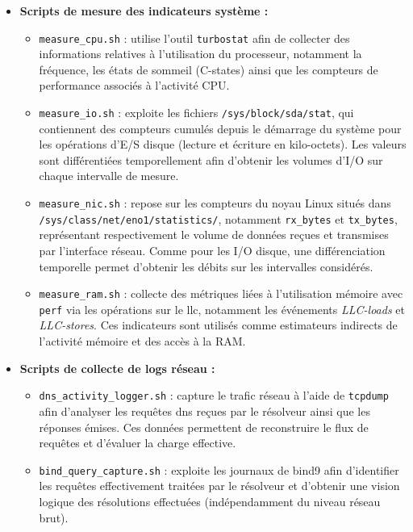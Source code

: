 \documentclass[12pt, a4paper]{report}
\begin{document}
	\begin{itemize}
		\item \textbf{Scripts de mesure des indicateurs système :}
		\begin{itemize}
			\item \texttt{measure\_cpu.sh} : utilise l'outil \texttt{turbostat} afin de collecter des informations relatives à l'utilisation du processeur, notamment la fréquence, les états de sommeil (C-states) ainsi que les compteurs de performance associés à l'activité CPU.

			\item \texttt{measure\_io.sh} : exploite les fichiers \texttt{/sys/block/sda/stat}, qui contiennent des compteurs cumulés depuis le démarrage du système pour les opérations d'E/S disque (lecture et écriture en kilo-octets). Les valeurs sont différentiées temporellement afin d'obtenir les volumes d'I/O sur chaque intervalle de mesure.
			
			\item \texttt{measure\_nic.sh} : repose sur les compteurs du noyau Linux situés dans \\
			\texttt{/sys/class/net/eno1/statistics/}, notamment \texttt{rx\_bytes} et \texttt{tx\_bytes}, représentant respectivement le volume de données reçues et transmises par l'interface réseau. Comme pour les I/O disque, une différenciation temporelle permet d'obtenir les débits sur les intervalles considérés.
			
			\item \texttt{measure\_ram.sh} : collecte des métriques liées à l'utilisation mémoire avec \texttt{perf} via les opérations sur le \gls{llc}, notamment les événements \textit{LLC-loads} et \textit{LLC-stores}. Ces indicateurs sont utilisés comme estimateurs indirects de l'activité mémoire et des accès à la RAM.
			
		\end{itemize}
		
		\item \textbf{Scripts de collecte de logs réseau :}
		\begin{itemize}
			\item \texttt{dns\_activity\_logger.sh} : capture le trafic réseau à l'aide de \texttt{tcpdump} afin d'analyser les requêtes \gls{dns} reçues par le résolveur ainsi que les réponses émises. Ces données permettent de reconstruire le flux de requêtes et d'évaluer la charge effective.
			
			\item \texttt{bind\_query\_capture.sh} : exploite les journaux de \gls{bind9} afin d'identifier les requêtes effectivement traitées par le résolveur et d'obtenir une vision logique des résolutions effectuées (indépendamment du niveau réseau brut).
		\end{itemize}
		

\end{itemize}
\end{document}
